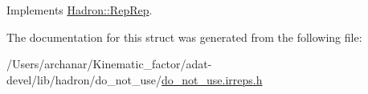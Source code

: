 Implements \mbox{\hyperlink{structHadron_1_1RepRep_ab3213025f6de249f7095892109575fde}{Hadron\+::\+Rep\+Rep}}.



The documentation for this struct was generated from the following file\+:\begin{DoxyCompactItemize}
\item 
/\+Users/archanar/\+Kinematic\+\_\+factor/adat-\/devel/lib/hadron/do\+\_\+not\+\_\+use/\mbox{\hyperlink{adat-devel_2lib_2hadron_2do__not__use_2do__not__use_8irreps_8h}{do\+\_\+not\+\_\+use.\+irreps.\+h}}\end{DoxyCompactItemize}

